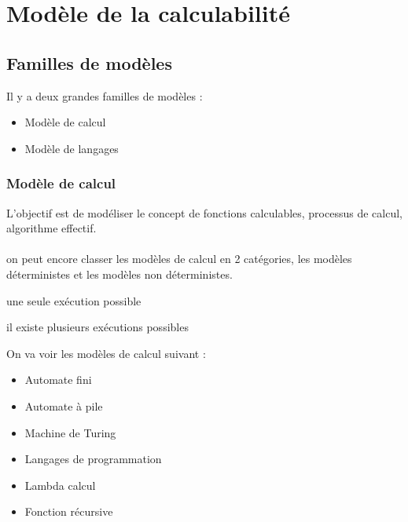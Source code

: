 
\section{Modèle de la calculabilité}
\label{sec:mod_le_de_la_calculabilit_}

\subsection{Familles de modèles}
\label{sub:fammilles_de_mod_les}

Il y a deux grandes familles de modèles :
\begin{itemize}
	\item Modèle de calcul
	\item Modèle de langages
\end{itemize}

\subsubsection{Modèle de calcul}
\label{ssub:mod_le_de_calcul}
L'objectif est de modéliser le concept de fonctions calculables, processus de 
calcul, algorithme effectif.

\paragraph{} on peut encore classer les modèles de calcul en 2 catégories, les 
modèles déterministes et les modèles non déterministes.

\begin{mydef} une seule exécution possible
\end{mydef}

\begin{mydef} il existe plusieurs exécutions 
	possibles
\end{mydef}

On va voir les modèles de calcul suivant : 
\begin{itemize}
	\item Automate fini
	\item Automate à pile
	\item Machine de Turing
	\item Langages de programmation
	\item Lambda calcul
	\item Fonction récursive
\end{itemize}

